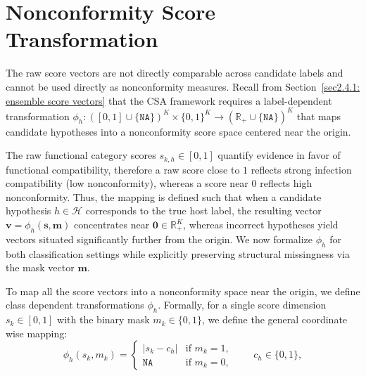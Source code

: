 
\section{Nonconformity Score Transformation}
\label{sec3.3: nc transformation}
The raw score vectors are not directly comparable across candidate labels and cannot be used directly as nonconformity 
measures. Recall from Section~\ref{sec2.4.1: ensemble score vectors} that the CSA framework requires a label-dependent 
transformation $\phi_h: ([0,1] \cup \{\texttt{NA}\})^K \times \{0,1\}^K \to \left(\mathbb{R}_+ \cup \{\texttt{NA}\}\right)^K$ 
that maps candidate hypotheses into a  nonconformity score space centered near the origin. 

The raw functional category scores $s_{k,h} \in [0, 1]$ quantify evidence in favor of functional compatibility, therefore a raw 
score close to $1$ reflects strong infection compatibility (low nonconformity), whereas a score near $0$ reflects high 
nonconformity. Thus, the mapping is defined such that when a candidate hypothesis $h \in \mathcal{H}$ corresponds to the true 
host label, the resulting vector $\mathbf{v} = \phi_h(\mathbf{s}, \mathbf{m})$ concentrates near $\mathbf{0} 
\in \mathbb{R}_+^K$, whereas incorrect hypotheses yield vectors situated significantly further from the origin. We now 
formalize $\phi_h$ for both classification settings while explicitly preserving structural missingness via the 
mask vector $\mathbf{m}$.

To map all the score vectors into a nonconformity space near the origin, we define class dependent 
transformations $\phi_h$. 
Formally, for a single score dimension $s_k \in [0,1]$ with the binary mask $m_k \in \{0,1\}$, 
we define the general coordinate wise mapping:
\begin{equation}
\label{eq: general nc transform}
\phi_h(s_k, m_k) = 
\begin{cases} 
|s_k - c_h| & \text{if } m_k = 1, \\
\texttt{NA} & \text{if } m_k = 0,
\end{cases}
\qquad c_h \in \{0, 1\},
\end{equation}

